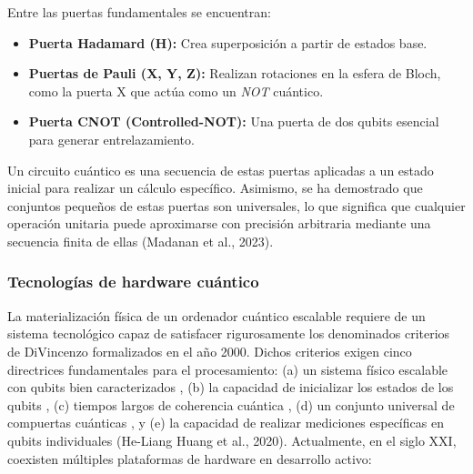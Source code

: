 \documentclass[12pt,a4paper]{article}
\begin{document}
Entre las puertas fundamentales se encuentran:
\begin{itemize}
    \item \textbf{Puerta Hadamard (H):} Crea superposición a partir de estados base.
    \item \textbf{Puertas de Pauli (X, Y, Z):} Realizan rotaciones en la esfera de Bloch, como la puerta X que actúa como un \textit{NOT} cuántico.
    \item \textbf{Puerta CNOT (Controlled-NOT):} Una puerta de dos qubits esencial para generar entrelazamiento.
\end{itemize}

Un circuito cuántico es una secuencia de estas puertas aplicadas a un estado inicial para realizar un cálculo específico. Asimismo, se ha demostrado que conjuntos pequeños de estas puertas son universales, lo que significa que cualquier operación unitaria puede aproximarse con precisión arbitraria mediante una secuencia finita de ellas (Madanan et al., 2023).

\subsubsection{Tecnologías de hardware cuántico}
La materialización física de un ordenador cuántico escalable requiere de un sistema tecnológico capaz de satisfacer rigurosamente los denominados criterios de DiVincenzo formalizados en el año 2000. 
Dichos criterios exigen cinco directrices fundamentales para el procesamiento: (a) un sistema físico escalable con qubits bien caracterizados , (b) la capacidad de inicializar los estados de los qubits , (c) tiempos largos de coherencia cuántica , (d) un conjunto universal de compuertas cuánticas , y (e) la capacidad de realizar mediciones específicas en qubits individuales (He-Liang Huang et al., 2020).
Actualmente, en el siglo XXI, coexisten múltiples plataformas de hardware en desarrollo activo:
\end{document}

